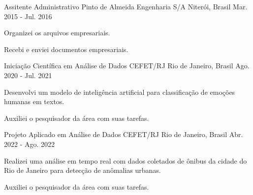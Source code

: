 

\begin{cventries}

  \cventry
    {Assitente Administrativo} %
    {Pinto de Almeida Engenharia S/A} %
    {Niterói, Brasil} %
    {Mar. 2015 - Jul. 2016} %
    {
      \begin{cvitems} %
        \item {Organizei os arquivos empresariais.}
        \item {Recebi e enviei documentos empresariais.}
      \end{cvitems}
    }

  \cventry
    {Iniciação Científica em Análise de Dados} %
    {CEFET/RJ} %
    {Rio de Janeiro, Brasil} %
    {Ago. 2020 - Jul. 2021} %
    {
      \begin{cvitems} %
        \item {Desenvolvi um modelo de inteligência artificial para classificação de emoções humanas em textos.}
        \item {Auxiliei o pesquisador da área com suas tarefas.}
      \end{cvitems}
    }

  \cventry
    {Projeto Aplicado em Análise de Dados} %
    {CEFET/RJ} %
    {Rio de Janeiro, Brasil} %
    {Abr. 2022 - Ago. 2022} %
    {
      \begin{cvitems} %
        \item {Realizei uma análise em tempo real com dados coletados de ônibus da cidade do Rio de Janeiro para detecção de anômalias urbanas.}
        \item {Auxiliei o pesquisador da área com suas tarefas.}
      \end{cvitems}
    }

\end{cventries}
